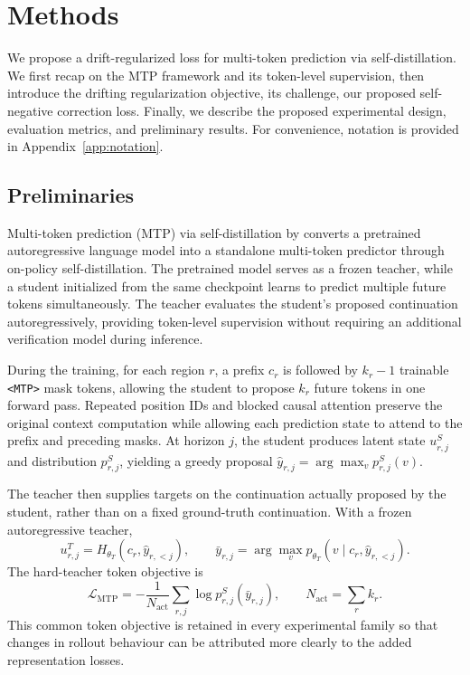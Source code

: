 \documentclass{article}
\begin{document}
\section{Methods}
\label{sec:methods}
We propose a drift-regularized loss for multi-token prediction via self-distillation. We first recap on the MTP framework and its token-level supervision, then introduce the drifting regularization objective, its challenge, our proposed self-negative correction loss. Finally, we describe the proposed experimental design, evaluation metrics, and preliminary results.
For convenience, notation is provided in
Appendix~\ref{app:notation}.
\subsection{Preliminaries}
\label{sec:mtp}

Multi-token prediction (MTP) via self-distillation by 
\citet{kirchenbauer2026mtp} converts a pretrained
autoregressive language model into a standalone multi-token
predictor through on-policy self-distillation. The pretrained
model serves as a frozen teacher, while a student initialized
from the same checkpoint learns to predict multiple future
tokens simultaneously. The teacher evaluates the student's
proposed continuation autoregressively, providing token-level
supervision without requiring an additional verification model
during inference.

During the training, for each region $r$, a prefix $c_r$ is followed by $k_r-1$ trainable \texttt{<MTP>} mask tokens, allowing the student to propose $k_r$ future tokens in one forward pass. Repeated position IDs and blocked causal attention preserve the original context computation while allowing each prediction state to attend to the prefix and preceding masks. At horizon $j$, the student produces latent state $u^S_{r,j}$ and distribution $p^S_{r,j}$, yielding a greedy proposal $\hat y_{r,j}=\arg\max_v p^S_{r,j}(v)$.

The teacher then supplies targets on the continuation actually proposed by the student, rather than on a fixed ground-truth continuation. With a frozen autoregressive teacher,
\begin{equation}
 u^T_{r,j}=H_{\theta_T}(c_r,\hat y_{r,<j}),\qquad
 \bar y_{r,j}=\arg\max_v p_{\theta_T}(v\mid c_r,\hat y_{r,<j}).
\end{equation}
The hard-teacher token objective is
\begin{equation}
 \mathcal L_{\mathrm{MTP}}=-\frac{1}{N_{\mathrm{act}}}\sum_{r,j}
 \log p^S_{r,j}(\bar y_{r,j}),\qquad N_{\mathrm{act}}=\sum_r k_r.
\end{equation}
This common token objective is retained in every experimental family so that changes in rollout behaviour can be attributed more clearly to the added representation losses.
\end{document}
